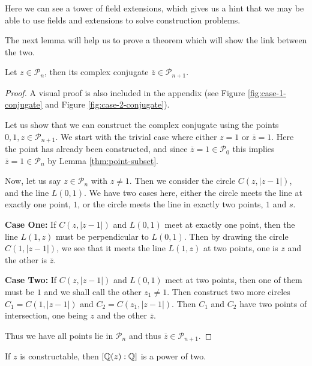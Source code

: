Here we can see a tower of field extensions, which gives us a hint that we may be able to use fields and extensions to solve construction problems.

The next lemma will help us to prove a theorem which will show the link between the two.

\begin{lemma}\label{lemma:conjugate-in-Pn}
    Let $z \in \mathcal{P}_n$, then its complex conjugate $\overline{z} \in \mathcal{P}_{n+1}$.
\end{lemma}

\begin{proof}  
    A visual proof is also included in the appendix (see Figure \ref{fig:case-1-conjugate} and Figure \ref{fig:case-2-conjugate}).
    
    Let us show that we can construct the complex conjugate using the points $0, 1, z\in \mathcal{P}_{n+1}$.
    We start with the trivial case where either $z=1$ or $\overline{z}=1$. Here the point has already been constructed, and since $\overline{z}=1\in \mathcal{P}_0$ this implies $\overline{z}=1\in \mathcal{P}_n$ by Lemma \ref{thm:point-subset}.


    Now, let us say $z\in \mathcal{P}_n$ with $z\neq1$. Then we consider the circle $C(z,|z-1|)$, and the line $L(0,1)$. We have two cases here, either the circle meets the line at exactly one point, $1$, or the circle meets the line in exactly two points, $1$ and $s$.

    \textbf{Case One:} If $C(z,|z-1|)$ and $L(0,1)$ meet at exactly one point, then the line $L(1,z)$ must be perpendicular to $L(0,1)$. Then by drawing the circle $C(1,|z-1|)$, we see that it meets the line $L(1,z)$ at two points, one is $z$ and the other is $\overline{z}$.

    \textbf{Case Two:} If $C(z,|z-1|)$ and $L(0,1)$ meet at two points, then one of them must be $1$ and we shall call the other $z_1\neq1$. Then construct two more circles $C_1=C(1,|z-1|)$ and $C_2=C(z_1,|z-1|)$. Then $C_1$ and $C_2$ have two points of intersection, one being $z$ and the other $\overline{z}$.

    Thus we have all points lie in $\mathcal{P}_n$ and thus $\overline{z} \in \mathcal{P}_{n+1}$.
\end{proof}

\begin{theorem}\label{thm:power-of-two-construction}
    If $z$ is constructable, then $[\mathbb Q(z):\mathbb Q]$ is a power of two.
\end{theorem}

